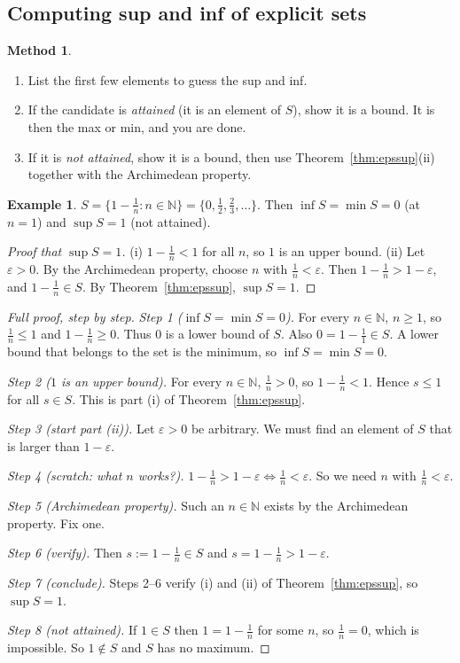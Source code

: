 \documentclass[11pt]{article}
\theoremstyle{definition}
\newtheorem{ex}[defn]{Example}
\newtheorem{method}[defn]{Method}
\newcommand{\N}{\mathbb{N}}
\newcommand{\eps}{\varepsilon}
\begin{document}
\subsection{Computing sup and inf of explicit sets}
\begin{method}
\begin{enumerate}[nosep]
  \item List the first few elements to guess the sup and inf.
  \item If the candidate is \emph{attained} (it is an element of $S$),
        show it is a bound. It is then the max or min, and you are done.
  \item If it is \emph{not attained}, show it is a bound, then use
        Theorem~\ref{thm:epssup}(ii) together with the Archimedean property.
\end{enumerate}
\end{method}

\begin{ex}
$S=\{1-\frac1n:n\in\N\}=\{0,\tfrac12,\tfrac23,\dots\}$. Then $\inf S=\min S=0$
(at $n=1$) and $\sup S=1$ (not attained).
\begin{proof}[Proof that $\sup S=1$]
(i) $1-\frac1n<1$ for all $n$, so $1$ is an upper bound. (ii) Let $\eps>0$.
By the Archimedean property, choose $n$ with $\frac1n<\eps$. Then
$1-\frac1n>1-\eps$, and $1-\frac1n\in S$. By Theorem~\ref{thm:epssup},
$\sup S=1$.
\end{proof}

\begin{proof}[Full proof, step by step]
\emph{Step 1 ($\inf S=\min S=0$).} For every $n\in\N$, $n\ge1$, so
$\frac1n\le1$ and $1-\frac1n\ge0$. Thus $0$ is a lower bound of $S$. Also
$0=1-\frac11\in S$. A lower bound that belongs to the set is the minimum,
so $\inf S=\min S=0$.

\emph{Step 2 ($1$ is an upper bound).} For every $n\in\N$, $\frac1n>0$, so
$1-\frac1n<1$. Hence $s\le1$ for all $s\in S$. This is part (i) of
Theorem~\ref{thm:epssup}.

\emph{Step 3 (start part (ii)).} Let $\eps>0$ be arbitrary. We must find
an element of $S$ that is larger than $1-\eps$.

\emph{Step 4 (scratch: what $n$ works?).}
$1-\frac1n>1-\eps\iff\frac1n<\eps$. So we need $n$ with $\frac1n<\eps$.

\emph{Step 5 (Archimedean property).} Such an $n\in\N$ exists by the
Archimedean property. Fix one.

\emph{Step 6 (verify).} Then $s:=1-\frac1n\in S$ and
$s=1-\frac1n>1-\eps$.

\emph{Step 7 (conclude).} Steps 2--6 verify (i) and (ii) of
Theorem~\ref{thm:epssup}, so $\sup S=1$.

\emph{Step 8 (not attained).} If $1\in S$ then $1=1-\frac1n$ for some $n$,
so $\frac1n=0$, which is impossible. So $1\notin S$ and $S$ has no maximum.
\end{proof}
\end{ex}
\end{document}
